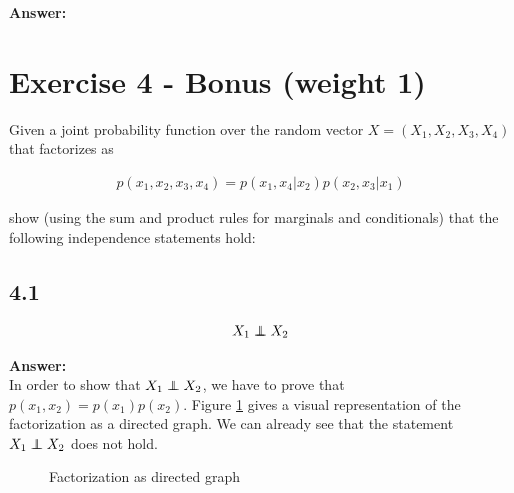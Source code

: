 \documentclass[a4paper]{article}
\newcommand\independent{\protect\mathpalette{\protect\independenT}{\perp}}
\def\independenT#1#2{\mathrel{\rlap{$#1#2$}\mkern2mu{#1#2}}}
\begin{document}
\textbf{Answer:}\\


\section*{Exercise 4 - Bonus (weight 1)}

Given a joint probability function over the random vector $X = (X_1, X_2, X_3, X_4)$ that factorizes as

\begin{align*}
	p(x_1,x_2,x_3,x_4) = p(x_1,x_4|x_2)p(x_2,x_3|x_1)
\end{align*}

show (using the sum and product rules for marginals and conditionals) that the following independence statements hold:

\subsection*{4.1}

\begin{align*}
	X_1 \independent X_2
\end{align*}


\textbf{Answer:}\\

In order to show that $X_1 \independent X_2$, we have to prove that $p(x_1, x_2) = p(x_1)p(x_2)$. Figure \ref{fig:directed_graph} gives a visual representation of the factorization as a directed graph. We can already see that the statement $X_1 \independent X_2$ does not hold.


\begin{figure}[h]
\centering
\caption{Factorization as directed graph} \label{fig:directed_graph}
\end{figure}
\end{document}
